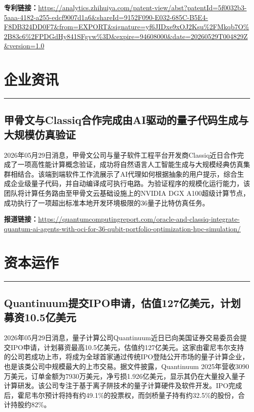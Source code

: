 \documentclass[12pt,a4paper]{ctexart}
\begin{document}
\noindent\textbf{专利链接：}\url{https://analytics.zhihuiya.com/patent-view/abst?patentId=5f0032b3-5aaa-4182-a255-edcf9007d1a6&shareId=9152F090-E032-685C-B5E4-F8DB324DD0F7&from=EXPORT&signature=yf6JIDxe9xOJ2Ksu%2FMkqb7O%2B83c6%2FPDGdHy841SFgvw%3D&expire=94608000&date=20260529T004829Z&version=1.0}




\newpage
\section{企业资讯}
\vspace{-0.5em}
\noindent\rule{\linewidth}{1.5pt}

\subsection{ 甲骨文与Classiq合作完成由AI驱动的量子代码生成与大规模仿真验证 }

2026年05月29日消息，甲骨文公司与量子软件工程平台开发商Classiq近日合作完成了一项高性能计算概念验证，成功将自然语言人工智能生成与大规模经典仿真集群相结合。该端到端软件工作流展示了AI代理如何根据抽象的用户提示，综合生成企业级量子代码，并自动编译成可执行电路。为验证程序的规模化运行能力，该团队将计算任务路由至甲骨文云基础设施上的NVIDIA DGX A100超级计算节点，成功执行了一项超出标准本地开发环境极限的36量子比特仿真任务。

\noindent\textbf{报道链接：}\url{https://quantumcomputingreport.com/oracle-and-classiq-integrate-quantum-ai-agents-with-oci-for-36-qubit-portfolio-optimization-hpc-simulation/}


\newpage
\section{资本运作}
\vspace{-0.5em}
\noindent\rule{\linewidth}{1.5pt}

\subsection{ Quantinuum提交IPO申请，估值127亿美元，计划募资10.5亿美元 }

2026年05月29日消息，量子计算公司Quantinuum近日已向美国证券交易委员会提交IPO申请，计划募资最高10.5亿美元，估值约127亿美元。这家由霍尼韦尔支持的公司若成功上市，将成为全球首家通过传统IPO登陆公开市场的量子计算企业，也是该类公司中规模最大的上市交易。据文件披露，Quantinuum 2025年营收3090万美元，订单金额为7930万美元，净亏损1.926亿美元，显示其仍在大量投入量子计算研发。该公司专注于基于离子阱技术的量子计算硬件及软件开发。IPO完成后，霍尼韦尔预计将持有约49.1\%的投票权，而剑桥量子持有约32.5\%的股份，合计持股约82\%。
\end{document}
